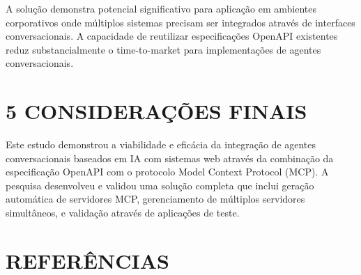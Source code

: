 \documentclass[
]{article}
\begin{document}
A solução demonstra potencial significativo para aplicação em ambientes
corporativos onde múltiplos sistemas precisam ser integrados através de
interfaces conversacionais. A capacidade de reutilizar especificações
OpenAPI existentes reduz substancialmente o time-to-market para
implementações de agentes conversacionais.

\section{5 CONSIDERAÇÕES FINAIS}\label{considerauxe7uxf5es-finais}

Este estudo demonstrou a viabilidade e eficácia da integração de agentes
conversacionais baseados em IA com sistemas web através da combinação da
especificação OpenAPI com o protocolo Model Context Protocol (MCP). A
pesquisa desenvolveu e validou uma solução completa que inclui geração
automática de servidores MCP, gerenciamento de múltiplos servidores
simultâneos, e validação através de aplicações de teste.

\section*{REFERÊNCIAS}\label{referuxeancias}
\end{document}
